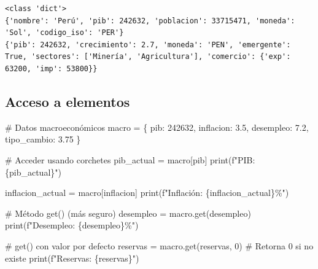 \documentclass[
  doc,
  floatsintext,
  longtable,
  a4paper,
  nolmodern,
  notxfonts,
  notimes,
  12pt,
  colorlinks=true,linkcolor=blue,citecolor=blue,urlcolor=blue]{apa7}
\newenvironment{Shaded}{\begin{snugshade}}{\end{snugshade}}
\newcommand{\BuiltInTok}[1]{\textcolor[rgb]{0.00,0.23,0.31}{#1}}
\newcommand{\CommentTok}[1]{\textcolor[rgb]{0.37,0.37,0.37}{#1}}
\newcommand{\DecValTok}[1]{\textcolor[rgb]{0.68,0.00,0.00}{#1}}
\newcommand{\FloatTok}[1]{\textcolor[rgb]{0.68,0.00,0.00}{#1}}
\newcommand{\NormalTok}[1]{\textcolor[rgb]{0.00,0.23,0.31}{#1}}
\newcommand{\OperatorTok}[1]{\textcolor[rgb]{0.37,0.37,0.37}{#1}}
\newcommand{\SpecialCharTok}[1]{\textcolor[rgb]{0.37,0.37,0.37}{#1}}
\newcommand{\SpecialStringTok}[1]{\textcolor[rgb]{0.13,0.47,0.30}{#1}}
\newcommand{\StringTok}[1]{\textcolor[rgb]{0.13,0.47,0.30}{#1}}
\begin{document}
\begin{verbatim}
<class 'dict'>
{'nombre': 'Perú', 'pib': 242632, 'poblacion': 33715471, 'moneda': 'Sol', 'codigo_iso': 'PER'}
{'pib': 242632, 'crecimiento': 2.7, 'moneda': 'PEN', 'emergente': True, 'sectores': ['Minería', 'Agricultura'], 'comercio': {'exp': 63200, 'imp': 53800}}
\end{verbatim}

\subsection{Acceso a elementos}\label{acceso-a-elementos}

\begin{Shaded}
\begin{Highlighting}[]
\CommentTok{\# Datos macroeconómicos}
\NormalTok{macro }\OperatorTok{=}\NormalTok{ \{}
    \StringTok{\textquotesingle{}pib\textquotesingle{}}\NormalTok{: }\DecValTok{242632}\NormalTok{,}
    \StringTok{\textquotesingle{}inflacion\textquotesingle{}}\NormalTok{: }\FloatTok{3.5}\NormalTok{,}
    \StringTok{\textquotesingle{}desempleo\textquotesingle{}}\NormalTok{: }\FloatTok{7.2}\NormalTok{,}
    \StringTok{\textquotesingle{}tipo\_cambio\textquotesingle{}}\NormalTok{: }\FloatTok{3.75}
\NormalTok{\}}

\CommentTok{\# Acceder usando corchetes}
\NormalTok{pib\_actual }\OperatorTok{=}\NormalTok{ macro[}\StringTok{\textquotesingle{}pib\textquotesingle{}}\NormalTok{]}
\BuiltInTok{print}\NormalTok{(}\SpecialStringTok{f"PIB: }\SpecialCharTok{\{}\NormalTok{pib\_actual}\SpecialCharTok{\}}\SpecialStringTok{"}\NormalTok{)}

\NormalTok{inflacion\_actual }\OperatorTok{=}\NormalTok{ macro[}\StringTok{\textquotesingle{}inflacion\textquotesingle{}}\NormalTok{]}
\BuiltInTok{print}\NormalTok{(}\SpecialStringTok{f"Inflación: }\SpecialCharTok{\{}\NormalTok{inflacion\_actual}\SpecialCharTok{\}}\SpecialStringTok{\%"}\NormalTok{)}

\CommentTok{\# Método get() (más seguro)}
\NormalTok{desempleo }\OperatorTok{=}\NormalTok{ macro.get(}\StringTok{\textquotesingle{}desempleo\textquotesingle{}}\NormalTok{)}
\BuiltInTok{print}\NormalTok{(}\SpecialStringTok{f"Desempleo: }\SpecialCharTok{\{}\NormalTok{desempleo}\SpecialCharTok{\}}\SpecialStringTok{\%"}\NormalTok{)}

\CommentTok{\# get() con valor por defecto}
\NormalTok{reservas }\OperatorTok{=}\NormalTok{ macro.get(}\StringTok{\textquotesingle{}reservas\textquotesingle{}}\NormalTok{, }\DecValTok{0}\NormalTok{)  }\CommentTok{\# Retorna 0 si no existe}
\BuiltInTok{print}\NormalTok{(}\SpecialStringTok{f"Reservas: }\SpecialCharTok{\{}\NormalTok{reservas}\SpecialCharTok{\}}\SpecialStringTok{"}\NormalTok{)}


\end{Highlighting}
\end{Shaded}
\end{document}
